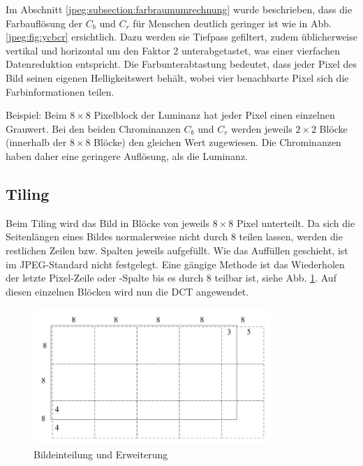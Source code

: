 Im Abschnitt \ref{jpeg:subsection:farbraumumrechnung} wurde beschrieben, dass die Farbauflösung der \(C_b\) und \(C_r\) für Menschen deutlich geringer ist wie in Abb. \ref{jpeg:fig:ycbcr} ersichtlich.
Dazu werden sie Tiefpass gefiltert, zudem üblicherweise vertikal und horizontal um den Faktor 2 unterabgetastet, was einer vierfachen Datenreduktion entspricht.
Die Farbunterabtastung bedeutet, dass jeder Pixel des Bild seinen eigenen Helligkeitswert behält, wobei vier benachbarte Pixel sich die Farbinformationen teilen.

Beispiel: Beim \(8\times8\) Pixelblock der Luminanz hat jeder Pixel einen einzelnen Grauwert.
Bei den beiden Chrominanzen \(C_b\) und \(C_r\) werden jeweils \(2\times2\) Blöcke (innerhalb der \(8\times8\) Blöcke) den gleichen Wert zugewiesen.
Die Chrominanzen haben daher eine geringere Auflösung, als die Luminanz.

\subsection{Tiling
\label{jpeg:subsection:tiling}}
Beim Tiling wird das Bild in Blöcke von jeweils \(8\times8\) Pixel unterteilt.
Da sich die Seitenlängen eines Bildes normalerweise nicht durch 8 teilen lassen, werden die restlichen Zeilen bzw. Spalten jeweils aufgefüllt.
Wie das Auffüllen geschieht, ist im JPEG-Standard nicht festgelegt.
Eine gängige Methode ist das Wiederholen der letzte Pixel-Zeile oder -Spalte bis es durch 8 teilbar ist, siehe Abb. \ref{jpeg:fig:tiling}.
Auf diesen einzelnen Blöcken wird nun die DCT angewendet.

\begin{figure}
    \centering
    \includegraphics[width=90mm]{papers/jpeg/pictures/unterteilung.pdf}
    \caption{Bildeinteilung und Erweiterung
        \label{jpeg:fig:tiling}}
\end{figure}


